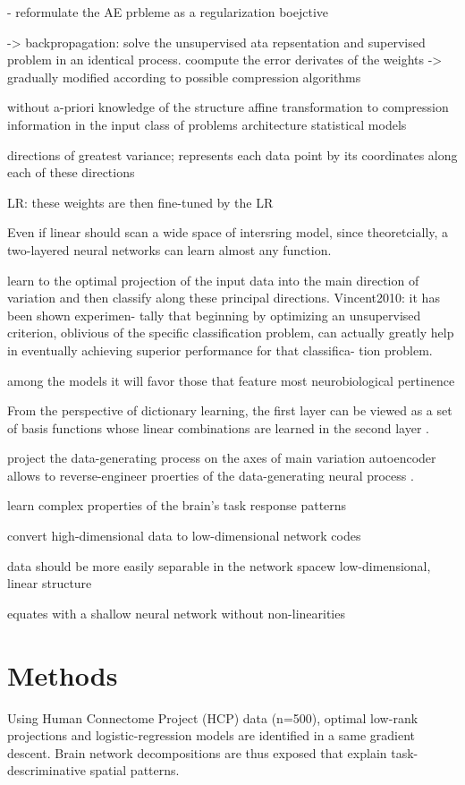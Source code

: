 \documentclass{article} %
\begin{document}
- reformulate the AE prbleme as a regularization boejctive

-> backpropagation: solve the unsupervised ata repsentation and supervised
problem in an identical process.
coompute the error derivates of the weights
-> gradually modified according to possible compression algorithms

without a-priori knowledge of the structure
affine transformation to compression information in the input
class of problems
architecture
statistical models

directions of greatest variance; represents each data point by its coordinates along each of these directions

LR:
these weights are then fine-tuned by the LR

Even if linear should scan a wide space of intersring model, since
theoretcially, a two-layered neural networks can learn almost any function.

learn to the optimal projection of the input data
into the main direction of variation and
then classify along these principal directions.
Vincent2010: it has been shown experimen- tally that
beginning by optimizing an unsupervised criterion, oblivious of the specific
classification problem, can actually greatly help in eventually achieving
superior performance for that classifica- tion problem.

among the models it will favor those that feature most neurobiological
pertinence

From the perspective of dictionary learning, the first layer can be
viewed as a set of basis functions whose linear combinations are learned
in the second layer \cite{olshausen96}.

project the data-generating process on the axes of main variation
autoencoder allows to reverse-engineer proerties of the data-generating
neural process \cite{olshausen96}.

learn complex properties of the brain's task response patterns

convert high-dimensional data to low-dimensional network codes

data should be more easily separable in the network spacew
low-dimensional, linear structure

equates with a shallow neural network without non-linearities






%
\section{Methods}
%
Using
Human Connectome Project (HCP) data (n=500), optimal low-rank projections and
logistic-regression models are identified in a same gradient descent. Brain
network decompositions are thus exposed that explain task-descriminative spatial
patterns.
\end{document}
